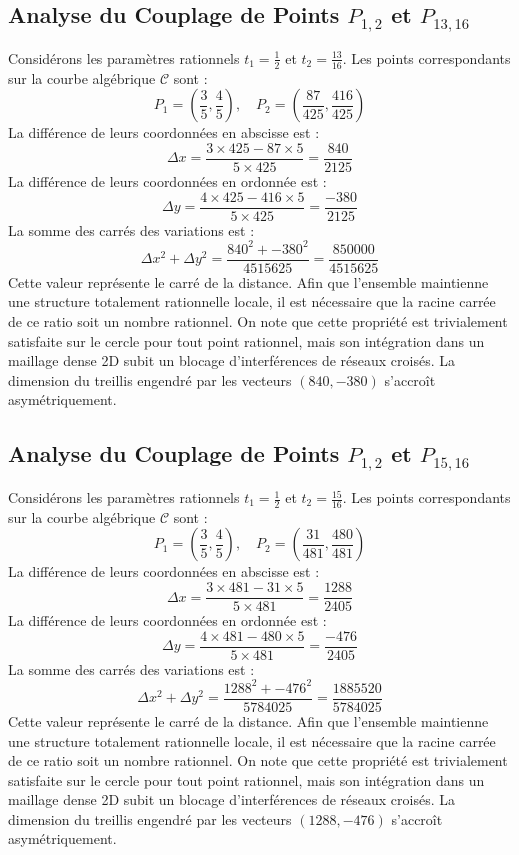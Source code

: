 \documentclass[12pt, a4paper]{article}
\begin{document}
\subsection{Analyse du Couplage de Points $P_{1,2}$ et $P_{13,16}$}
Considérons les paramètres rationnels $t_1 = \frac{1}{2}$ et $t_2 = \frac{13}{16}$.
Les points correspondants sur la courbe algébrique $\mathcal{C}$ sont :
$$ P_1 = \left( \frac{3}{5}, \frac{4}{5} \right), \quad P_2 = \left( \frac{87}{425}, \frac{416}{425} \right) $$
La différence de leurs coordonnées en abscisse est :
$$ \Delta x = \frac{3 \times 425 - 87 \times 5}{5 \times 425} = \frac{840}{2125} $$
La différence de leurs coordonnées en ordonnée est :
$$ \Delta y = \frac{4 \times 425 - 416 \times 5}{5 \times 425} = \frac{-380}{2125} $$
La somme des carrés des variations est :
$$ \Delta x^2 + \Delta y^2 = \frac{ 840^2 + -380^2 }{ 4515625 } = \frac{ 850000 }{ 4515625 } $$
Cette valeur représente le carré de la distance. Afin que l'ensemble maintienne une structure totalement rationnelle locale, il est nécessaire que la racine carrée de ce ratio soit un nombre rationnel. On note que cette propriété est trivialement satisfaite sur le cercle pour tout point rationnel, mais son intégration dans un maillage dense 2D subit un blocage d'interférences de réseaux croisés. La dimension du treillis engendré par les vecteurs $( 840, -380 )$ s'accroît asymétriquement.


\subsection{Analyse du Couplage de Points $P_{1,2}$ et $P_{15,16}$}
Considérons les paramètres rationnels $t_1 = \frac{1}{2}$ et $t_2 = \frac{15}{16}$.
Les points correspondants sur la courbe algébrique $\mathcal{C}$ sont :
$$ P_1 = \left( \frac{3}{5}, \frac{4}{5} \right), \quad P_2 = \left( \frac{31}{481}, \frac{480}{481} \right) $$
La différence de leurs coordonnées en abscisse est :
$$ \Delta x = \frac{3 \times 481 - 31 \times 5}{5 \times 481} = \frac{1288}{2405} $$
La différence de leurs coordonnées en ordonnée est :
$$ \Delta y = \frac{4 \times 481 - 480 \times 5}{5 \times 481} = \frac{-476}{2405} $$
La somme des carrés des variations est :
$$ \Delta x^2 + \Delta y^2 = \frac{ 1288^2 + -476^2 }{ 5784025 } = \frac{ 1885520 }{ 5784025 } $$
Cette valeur représente le carré de la distance. Afin que l'ensemble maintienne une structure totalement rationnelle locale, il est nécessaire que la racine carrée de ce ratio soit un nombre rationnel. On note que cette propriété est trivialement satisfaite sur le cercle pour tout point rationnel, mais son intégration dans un maillage dense 2D subit un blocage d'interférences de réseaux croisés. La dimension du treillis engendré par les vecteurs $( 1288, -476 )$ s'accroît asymétriquement.
\end{document}
